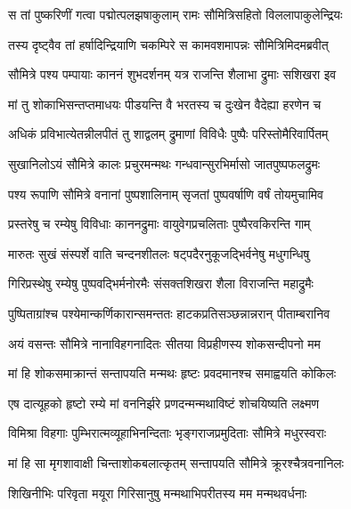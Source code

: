 

\twolineshloka
{स तां पुष्करिणीं गत्वा पद्मोत्पलझषाकुलाम्}
{रामः सौमित्रिसहितो विललापाकुलेन्द्रियः} %

\twolineshloka
{तस्य दृष्ट्वैव तां हर्षादिन्द्रियाणि चकम्पिरे}
{स कामवशमापन्नः सौमित्रिमिदमब्रवीत्} %

\twolineshloka
{सौमित्रे पश्य पम्पायाः काननं शुभदर्शनम्}
{यत्र राजन्ति शैलाभा द्रुमाः सशिखरा इव} %

\twolineshloka
{मां तु शोकाभिसन्तप्तमाधयः पीडयन्ति वै}
{भरतस्य च दुःखेन वैदेह्या हरणेन च} %

\twolineshloka
{अधिकं प्रविभात्येतन्नीलपीतं तु शाद्वलम्}
{द्रुमाणां विविधैः पुष्पैः परिस्तोमैरिवार्पितम्} %

\twolineshloka
{सुखानिलोऽयं सौमित्रे कालः प्रचुरमन्मथः}
{गन्धवान्सुरभिर्मासो जातपुष्पफलद्रुमः} %

\twolineshloka
{पश्य रूपाणि सौमित्रे वनानां पुष्पशालिनाम्}
{सृजतां पुष्पवर्षाणि वर्षं तोयमुचामिव} %

\twolineshloka
{प्रस्तरेषु च रम्येषु विविधाः काननद्रुमाः}
{वायुवेगप्रचलिताः पुष्पैरवकिरन्ति गाम्} %

\twolineshloka
{मारुतः सुखं संस्पर्शे वाति चन्दनशीतलः}
{षट्पदैरनुकूजद्भिर्वनेषु मधुगन्धिषु} %

\twolineshloka
{गिरिप्रस्थेषु रम्येषु पुष्पवद्भिर्मनोरमैः}
{संसक्तशिखरा शैला विराजन्ति महाद्रुमैः} %

\twolineshloka
{पुष्पिताग्रांश्च पश्येमान्कर्णिकारान्समन्ततः}
{हाटकप्रतिसञ्छन्नान्नरान् पीताम्बरानिव} %

\twolineshloka
{अयं वसन्तः सौमित्रे नानाविहगनादितः}
{सीतया विप्रहीणस्य शोकसन्दीपनो मम} %

\twolineshloka
{मां हि शोकसमाक्रान्तं सन्तापयति मन्मथः}
{हृष्टः प्रवदमानश्च समाह्वयति कोकिलः} %

\twolineshloka
{एष दात्यूहको हृष्टो रम्ये मां वननिर्झरे}
{प्रणदन्मन्मथाविष्टं शोचयिष्यति लक्ष्मण} %

\twolineshloka
{विमिश्रा विहगाः पुम्भिरात्मव्यूहाभिनन्दिताः}
{भृङ्गराजप्रमुदिताः सौमित्रे मधुरस्वराः} %

\twolineshloka
{मां हि सा मृगशावाक्षी चिन्ताशोकबलात्कृतम्}
{सन्तापयति सौमित्रे क्रूरश्चैत्रवनानिलः} %

\twolineshloka
{शिखिनीभिः परिवृता मयूरा गिरिसानुषु}
{मन्मथाभिपरीतस्य मम मन्मथवर्धनाः} %

